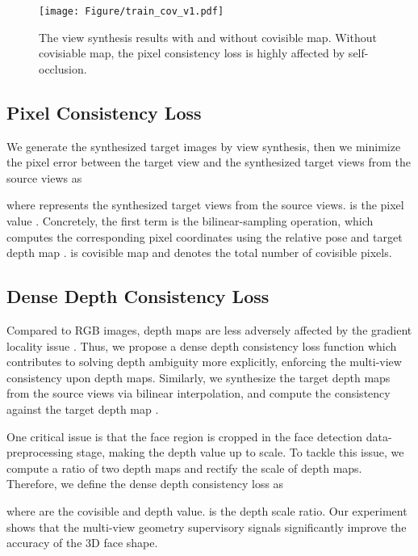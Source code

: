\documentclass[runningheads]{llncs}
\begin{document}
\begin{figure}[htbp]
	\centering
	\texttt{[image: Figure/train\_cov\_v1.pdf]}
	\caption{The view synthesis results with and without covisible map. Without covisiable map, the pixel consistency loss is highly affected by self-occlusion.
	}
	\label{fig:train_cov_right}
\end{figure}


\subsection{Pixel Consistency Loss} \label{sec:pixel}






We generate the synthesized target images by view synthesis, then we minimize the pixel error between the target view and the synthesized target views from the source views as

where  represents the synthesized target views from the source views.
 is the  pixel value .
Concretely, the first term  is the bilinear-sampling operation, which computes the corresponding pixel coordinates using the relative pose  and target depth map .  is covisible map and  denotes the total number of covisible pixels.


\subsection{Dense Depth Consistency Loss} \label{sec:depth}
Compared to RGB images, depth maps are less adversely affected by the gradient locality issue \cite{bergen1992hierarchical}.
Thus, we propose a dense depth consistency loss function which contributes to solving depth ambiguity more explicitly, enforcing the multi-view consistency upon depth maps.
Similarly, we synthesize the target depth maps  from the source views via bilinear interpolation, and compute the consistency against the target depth map .


One critical issue is that the face region is cropped in the face detection data-preprocessing stage, making the depth value up to scale. 
To tackle this issue, we compute a ratio of two depth maps  and rectify the scale of depth maps. Therefore, we define the dense depth consistency loss as

where  are the  covisible and depth value.
 is the depth scale ratio.
Our experiment shows that the multi-view geometry supervisory signals significantly improve the accuracy of the 3D face shape.
\end{document}

